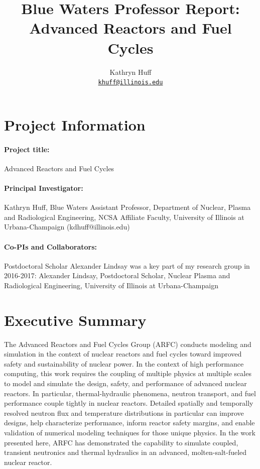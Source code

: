 \documentclass[letterpaper]{article}
\author{Kathryn Huff
\\ \href{mailto:kdhuff@illinois.edu}{\texttt{khuff@illinois.edu}}
}
\date{}
\title{Blue Waters Professor Report:\\
Advanced Reactors and Fuel Cycles}
\begin{document}
\maketitle

\section{Project Information}

\paragraph{Project title:} Advanced Reactors and Fuel Cycles

\paragraph{Principal Investigator:} Kathryn Huff, Blue Waters Assistant Professor, Department of Nuclear, Plasma and Radiological Engineering, NCSA Affiliate Faculty, University of Illinois at Urbana-Champaign (kdhuff@illinois.edu)
\paragraph{Co-PIs and Collaborators:} Postdoctoral Scholar Alexander Lindsay was a key part of my research group in 2016-2017:
Alexander Lindsay, Postdoctoral Scholar, Nuclear Plasma and Radiological Engineering, University of Illinois at Urbana-Champaign

\section{Executive Summary}
The Advanced Reactors and Fuel Cycles Group (ARFC) conducts modeling and
simulation in the context of nuclear reactors and fuel cycles toward improved
safety and sustainability of nuclear power. In the context of high performance
computing, this work requires the coupling of multiple physics at multiple
scales to model and simulate the design, safety, and performance of advanced
nuclear reactors. In particular, thermal-hydraulic phenomena, neutron
transport, and fuel performance couple tightly in nuclear reactors. Detailed
spatially and temporally resolved neutron flux and temperature distributions in
particular can improve designs, help characterize performance, inform reactor
safety margins, and enable validation of numerical modeling techniques for
those unique physics. In the work presented here, ARFC has demonstrated the
capability to simulate coupled, transient neutronics and thermal hydraulics in
an advanced, molten-salt-fueled nuclear reactor. 
\end{document}

